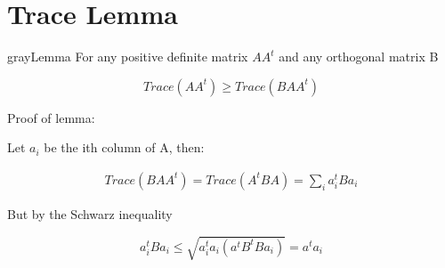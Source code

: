 \section{Trace Lemma}\label{ap:lemma}
\begin{mybox}{gray}{Lemma}
For any positive definite matrix $A A^t$ and any orthogonal matrix B 

\[ Trace( A A^t ) \geq Trace (B A A^t) \]

\end{mybox}


Proof of lemma:

Let $a_i$ be the ith column of A, then:

\begin{align*}
Trace( B A A^t ) = Trace (A^t B A) = \sum\limits_i a_i^t B a_i 
\end{align*}

But by the Schwarz inequality

\[ a_i^t B a_i \leq \sqrt{ a_i^t a_i (a^t B^t B a_i)} = a^t a_i \]
